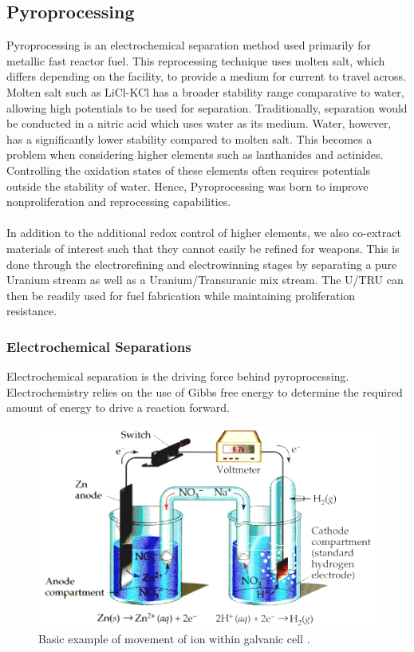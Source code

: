 \subsection{Pyroprocessing}
Pyroprocessing is an electrochemical separation method used primarily for metallic fast reactor fuel.
This reprocessing technique uses molten salt, which differs depending on the facility, to provide a medium for current to travel across.
Molten salt such as LiCl-KCl has a broader stability range comparative to water, allowing high potentials to be used for separation.
Traditionally, separation would be conducted in a nitric acid which uses water as its medium.
Water, however, has a significantly lower stability compared to molten salt.
This becomes a problem when considering higher elements such as lanthanides and actinides.
Controlling the oxidation states of these elements often requires potentials outside the stability of water.
Hence, Pyroprocessing was born to improve nonproliferation and reprocessing capabilities.
\\ \\
In addition to the additional redox control of higher elements, we also co-extract materials of interest such that they cannot easily be refined for weapons.
This is done through the electrorefining and electrowinning stages by separating a pure Uranium stream as well as a Uranium/Transuranic mix stream. 
The U/TRU can then be readily used for fuel fabrication while maintaining proliferation resistance.

\subsubsection{Electrochemical Separations}
Electrochemical separation is the driving force behind pyroprocessing. Electrochemistry relies on the use of Gibbs free energy to determine the required amount of energy to drive a reaction forward.

\begin{figure}[h]
	\centering
	\includegraphics[width=0.8\linewidth]{images/electrochem}
	\caption{Basic example of movement of ion within galvanic cell \cite{angel}.}
	\label{fig:electrochem}
\end{figure}

